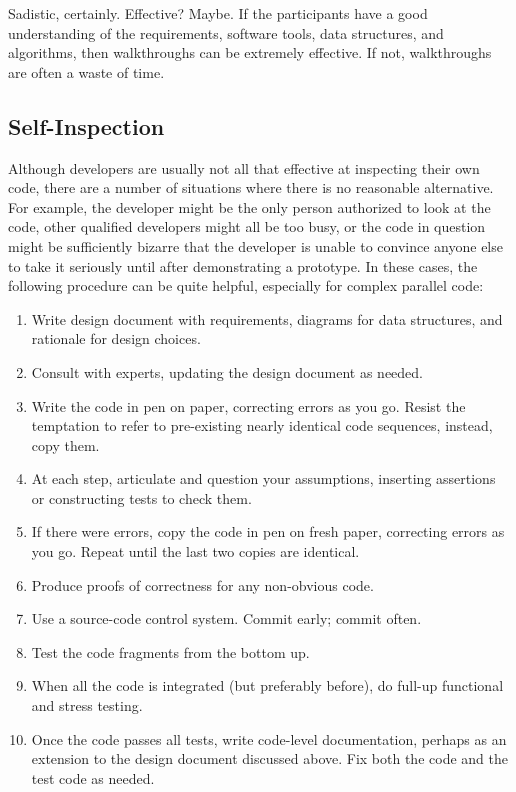 Sadistic, certainly.
Effective?
Maybe.
If the participants have a good understanding of the requirements,
software tools, data structures, and algorithms, then walkthroughs
can be extremely effective.
If not, walkthroughs are often a waste of time.

\subsection{Self-Inspection}
\label{sec:debugging:Self-Inspection}

Although developers are usually not all that effective at inspecting
their own code, there are a number of situations where there is no
reasonable alternative.
For example, the developer might be the only person authorized to look
at the code, other qualified developers might all be too busy, or
the code in question might be sufficiently bizarre that the developer
is unable to convince anyone else to take it seriously until after
demonstrating a prototype.
In these cases, the following procedure can be quite helpful,
especially for complex parallel code:

\begin{enumerate}
\item	Write design document with requirements, diagrams for data structures,
	and rationale for design choices.
\item	Consult with experts, updating the design document as needed.
\item	Write the code in pen on paper, correcting errors as you go.
	Resist the temptation to refer to pre-existing nearly identical code
	sequences, instead, copy them.
\item	At each step, articulate and question your assumptions,
	inserting assertions or constructing tests to check them.
\item	If there were errors, copy the code in pen on fresh paper, correcting
	errors as you go.
	Repeat until the last two copies are identical.
\item	Produce proofs of correctness for any non-obvious code.
\item	Use a source-code control system.
	Commit early; commit often.
\item	Test the code fragments from the bottom up.
\item	When all the code is integrated (but preferably before),
	do full-up functional and stress testing.
\item	Once the code passes all tests, write code-level documentation,
	perhaps as an extension to the design document discussed above.
	Fix both the code and the test code as needed.
\end{enumerate}


